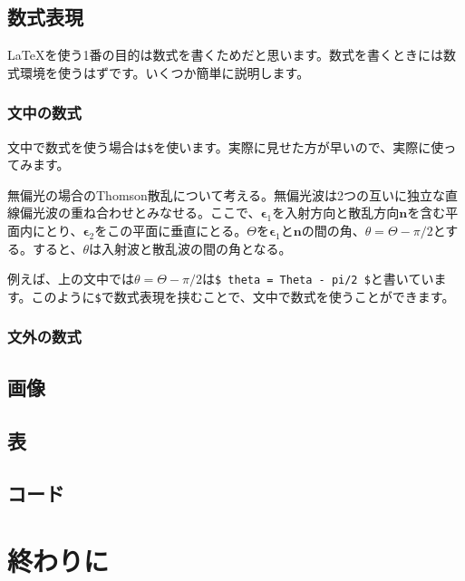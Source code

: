 \documentclass[a4paper,papersize,uplatex,dvipdfmx,10pt]{jsarticle}
\newcommand{\bs}{\symbol{92}} %
\begin{document}
\subsection{数式表現} %
\LaTeX を使う1番の目的は数式を書くためだと思います。数式を書くときには数式環境を使うはずです。いくつか簡単に説明します。

\subsubsection{文中の数式} %
文中で数式を使う場合は\texttt{\$}を使います。実際に見せた方が早いので、実際に使ってみます。

\begin{screen}
  無偏光の場合のThomson散乱について考える。無偏光波は2つの互いに独立な直線偏光波の重ね合わせとみなせる。ここで、$\bm{\epsilon}_{1}$を入射方向と散乱方向$\bm{n}$を含む平面内にとり、$\bm{\epsilon}_{2}$をこの平面に垂直にとる。$\Theta$を$\bm{\epsilon}_{1}$と$\bm{n}$の間の角、$\theta = \Theta - \pi/2$とする。すると、$\theta$は入射波と散乱波の間の角となる。
\end{screen}

例えば、上の文中では$\theta = \Theta - \pi/2$は\texttt{\$ \bs theta = \bs Theta - \bs pi/2 \$}と書いています。このように\texttt{\$}で数式表現を挟むことで、文中で数式を使うことができます。

\subsubsection{文外の数式} %


\subsection{画像} %

\subsection{表} %

\subsection{コード} %

\section{終わりに} %

\renewcommand{\bibname}{参考文献}


\end{document}
